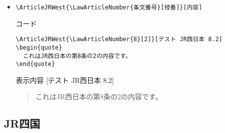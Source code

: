 \documentclass[oneside,10pt,a4paper]{jsarticle}
\begin{document}
\begin{itemize}
\begin{itembox}[l]{表示内容}
\begin{quote}
          これはJR西日本の第8条の内容です。
        \end{quote}
      \end{itembox}
    \item \verb|\ArticleJRWest{\LawArticleNumber{条文番号}[枝番]}[内容]|
      \begin{itembox}[l]{コード}
        {\footnotesize\begin{verbatim}
\ArticleJRWest{\LawArticleNumber{8}[2]}[テスト JR西日本 8.2]
\begin{quote}
  これはJR西日本の第8条の2の内容です。
\end{quote}\end{verbatim}}
      \end{itembox}
      \begin{itembox}[l]{表示内容}
        [テスト JR西日本 8.2]
        \begin{quote}
          これはJR西日本の第8条の2の内容です。
        \end{quote}
      \end{itembox}
  \end{itemize}

  \newpage

  \subsection{JR四国}
\end{document}
